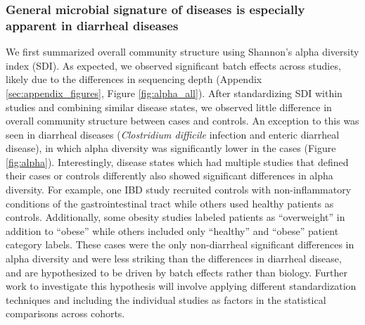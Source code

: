 \documentclass[12pt]{article}
\begin{document}
\subsubsection{General microbial signature of diseases is especially apparent in diarrheal diseases}
We first summarized overall community structure using Shannon's alpha diversity
index (SDI). As expected, we observed significant batch effects across studies, likely due to
the differences in sequencing depth (Appendix \ref{sec:appendix_figures}, Figure \ref{fig:alpha_all}). After standardizing SDI within studies
and combining similar disease states, we observed little difference in overall
community structure between cases and controls. An exception to this was seen
in diarrheal diseases (\textit{Clostridium difficile} infection and enteric 
diarrheal disease), in which alpha diversity was significantly lower in the cases (Figure \ref{fig:alpha}). Interestingly, disease states which had multiple studies that defined
their cases or controls differently also showed significant differences
in alpha diversity. For example, one IBD study \cite{ibd-papa} recruited controls
with non-inflammatory conditions of the gastrointestinal tract while others \cite{ibd-gevers, ibd-engstrand, ibd_hut}
used healthy patients as controls. Additionally, some obesity studies \cite{ob-escobar, ob-goodrich, ob-gordon} labeled patients as ``overweight'' in addition
to ``obese'' while others \cite{ob-ross, ob-zupancic} included only ``healthy'' and ``obese'' patient 
category labels. These cases were the only non-diarrheal significant
differences in alpha diversity and were less striking than the differences in
diarrheal disease, and are 
hypothesized to be driven by batch effects rather than biology.
Further work to investigate this hypothesis will involve applying 
different standardization techniques and including the 
individual studies as factors in the statistical comparisons across cohorts.
\end{document}
